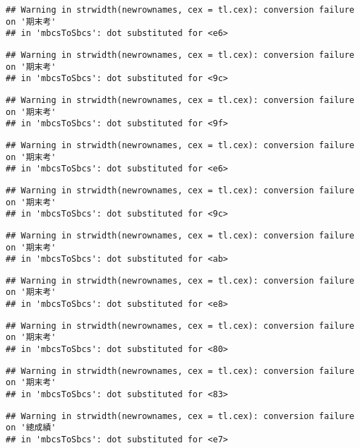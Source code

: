 \documentclass[
]{book}
\begin{document}
\begin{verbatim}
## Warning in strwidth(newrownames, cex = tl.cex): conversion failure on '期末考'
## in 'mbcsToSbcs': dot substituted for <e6>
\end{verbatim}

\begin{verbatim}
## Warning in strwidth(newrownames, cex = tl.cex): conversion failure on '期末考'
## in 'mbcsToSbcs': dot substituted for <9c>
\end{verbatim}

\begin{verbatim}
## Warning in strwidth(newrownames, cex = tl.cex): conversion failure on '期末考'
## in 'mbcsToSbcs': dot substituted for <9f>
\end{verbatim}

\begin{verbatim}
## Warning in strwidth(newrownames, cex = tl.cex): conversion failure on '期末考'
## in 'mbcsToSbcs': dot substituted for <e6>
\end{verbatim}

\begin{verbatim}
## Warning in strwidth(newrownames, cex = tl.cex): conversion failure on '期末考'
## in 'mbcsToSbcs': dot substituted for <9c>
\end{verbatim}

\begin{verbatim}
## Warning in strwidth(newrownames, cex = tl.cex): conversion failure on '期末考'
## in 'mbcsToSbcs': dot substituted for <ab>
\end{verbatim}

\begin{verbatim}
## Warning in strwidth(newrownames, cex = tl.cex): conversion failure on '期末考'
## in 'mbcsToSbcs': dot substituted for <e8>
\end{verbatim}

\begin{verbatim}
## Warning in strwidth(newrownames, cex = tl.cex): conversion failure on '期末考'
## in 'mbcsToSbcs': dot substituted for <80>
\end{verbatim}

\begin{verbatim}
## Warning in strwidth(newrownames, cex = tl.cex): conversion failure on '期末考'
## in 'mbcsToSbcs': dot substituted for <83>
\end{verbatim}

\begin{verbatim}
## Warning in strwidth(newrownames, cex = tl.cex): conversion failure on '總成績'
## in 'mbcsToSbcs': dot substituted for <e7>
\end{verbatim}
\end{document}
